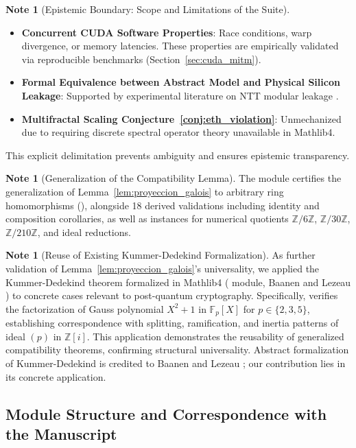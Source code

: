 \documentclass[11pt,a4paper]{article}
\theoremstyle{plain}
\theoremstyle{definition}
\newtheorem{remark}[teorema]{Note}
\numberwithin{equation}{section}
\newcommand{\ZZ}{\mathbb{Z}}
\newcommand{\FF}{\mathbb{F}}
\begin{document}
\begin{remark}[Epistemic Boundary: Scope and Limitations of the Suite]
\begin{itemize}
    \item \textbf{Concurrent CUDA Software Properties}: Race conditions, warp divergence, or memory latencies. These properties are empirically validated via reproducible benchmarks (Section~\ref{sec:cuda_mitm}).
    \item \textbf{Formal Equivalence between Abstract Model and Physical Silicon Leakage}: Supported by experimental literature on NTT modular leakage \cite{Ravi2020,Wenger2024}.
    \item \textbf{Multifractal Scaling Conjecture~\ref{conj:eth_violation}}: Unmechanized due to requiring discrete spectral operator theory unavailable in Mathlib4.
\end{itemize}
This explicit delimitation prevents ambiguity and ensures epistemic transparency.
\end{remark}

\begin{remark}[Generalization of the Compatibility Lemma]
\label{rem:generalizacion_lema}
The  module certifies the generalization of Lemma~\ref{lem:proyeccion_galois} to arbitrary ring homomorphisms (), alongside 18 derived validations including identity and composition corollaries, as well as instances for numerical quotients $\ZZ/6\ZZ$, $\ZZ/30\ZZ$, $\ZZ/210\ZZ$, and ideal reductions.
\end{remark}

\begin{remark}[Reuse of Existing Kummer-Dedekind Formalization]
\label{rem:extension_kummer}
As further validation of Lemma~\ref{lem:proyeccion_galois}'s universality, we applied the Kummer-Dedekind theorem formalized in Mathlib4 ( module, Baanen and Lezeau \cite{Baanen2021}) to concrete cases relevant to post-quantum cryptography. Specifically,  verifies the factorization of Gauss polynomial $X^2 + 1$ in $\FF_p[X]$ for $p \in \{2, 3, 5\}$, establishing correspondence with splitting, ramification, and inertia patterns of ideal $(p)$ in $\ZZ[i]$. This application demonstrates the reusability of generalized compatibility theorems, confirming structural universality. Abstract formalization of Kummer-Dedekind is credited to Baanen and Lezeau \cite{Baanen2021}; our contribution lies in its concrete application.
\end{remark}

\subsection{Module Structure and Correspondence with the Manuscript}
\label{subsec:estructura_lean}
\end{document}

